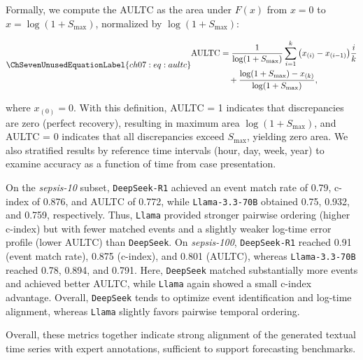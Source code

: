 



Formally, we compute the AULTC as the area under $F(x)$ from $x = 0$ to $x = \log(1 + S_{\text{max}})$, normalized by $\log(1 + S_{\text{max}})$:

\begin{equation*}
\ChSevenUnusedEquationLabel{ch07:eq:aultc}
\begin{aligned}
\text{AULTC}
&= \frac{1}{\log(1+S_{\max})}
   \sum_{i=1}^{k}\big(x_{(i)}-x_{(i-1)}\big)\frac{i}{k} \\
&\quad + \frac{\log(1+S_{\max})-x_{(k)}}{\log(1+S_{\max})},
\end{aligned}
\end{equation*}

where $x_{(0)} = 0$.
With this definition, AULTC = 1 indicates that discrepancies are zero (perfect recovery), resulting in maximum area $\log(1 + S_{\text{max}})$, and AULTC = 0 indicates that all discrepancies exceed $S_{\text{max}}$, yielding zero area.
We also stratified results by reference time intervals (hour, day, week, year) to examine accuracy as a function of time from case presentation.

On the \textit{sepsis-10} subset, \texttt{DeepSeek-R1} achieved an event match rate of 0.79, c-index of 0.876, and AULTC of 0.772, while \texttt{Llama-3.3-70B} obtained 0.75, 0.932, and 0.759, respectively.
Thus, \texttt{Llama} provided stronger pairwise ordering (higher c-index) but with fewer matched events and a slightly weaker log-time error profile (lower AULTC) than \texttt{DeepSeek}.
On \textit{sepsis-100}, \texttt{DeepSeek-R1} reached 0.91 (event match rate), 0.875 (c-index), and 0.801 (AULTC), whereas \texttt{Llama-3.3-70B} reached 0.78, 0.894, and 0.791.
Here, \texttt{DeepSeek} matched substantially more events and achieved better AULTC, while \texttt{Llama} again showed a small c-index advantage.
Overall, \texttt{DeepSeek} tends to optimize event identification and log-time alignment, whereas \texttt{Llama} slightly favors pairwise temporal ordering. 

Overall, these metrics together indicate strong alignment of the generated textual time series with expert annotations, sufficient to support forecasting benchmarks. 




